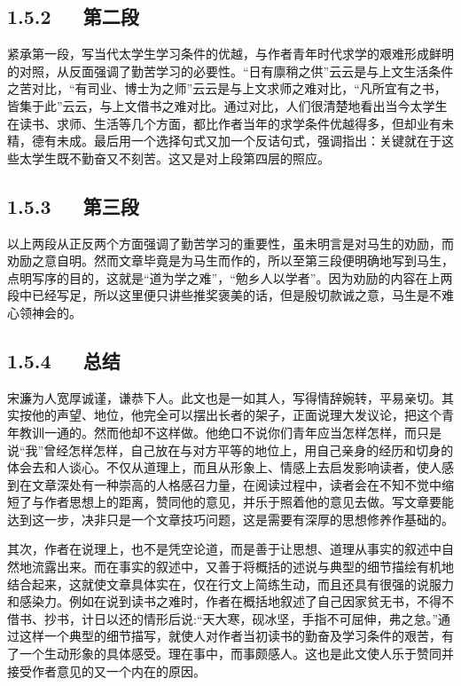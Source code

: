 \documentclass[letterpaper,10pt,english]{sphinxmanual}
\begin{document}
\subsection{1.5.2   第二段}
\label{\detokenize{p01_u6563_u6587/_u5b8b_u6fc2-_u9001_u4e1c_u9633_u9a6c_u751f_u5e8f:id9}}
紧承第一段，写当代太学生学习条件的优越，与作者青年时代求学的艰难形成鲜明的对照，从反面强调了勤苦学习的必要性。“日有廪稍之供”云云是与上文生活条件之苦对比，“有司业、博士为之师”云云是与上文求师之难对比，“凡所宜有之书，皆集于此”云云，与上文借书之难对比。通过对比，人们很清楚地看出当今太学生在读书、求师、生活等几个方面，都比作者当年的求学条件优越得多，但却业有未精，德有未成。最后用一个选择句式又加一个反诘句式，强调指出：关键就在于这些太学生既不勤奋又不刻苦。这又是对上段第四层的照应。


\subsection{1.5.3   第三段}
\label{\detokenize{p01_u6563_u6587/_u5b8b_u6fc2-_u9001_u4e1c_u9633_u9a6c_u751f_u5e8f:id10}}
以上两段从正反两个方面强调了勤苦学习的重要性，虽未明言是对马生的劝励，而劝励之意自明。然而文章毕竟是为马生而作的，所以至第三段便明确地写到马生，点明写序的目的，这就是“道为学之难”，“勉乡人以学者”。因为劝励的内容在上两段中已经写足，所以这里便只讲些推奖褒美的话，但是殷切款诚之意，马生是不难心领神会的。


\subsection{1.5.4   总结}
\label{\detokenize{p01_u6563_u6587/_u5b8b_u6fc2-_u9001_u4e1c_u9633_u9a6c_u751f_u5e8f:id11}}
宋濂为人宽厚诚谨，谦恭下人。此文也是一如其人，写得情辞婉转，平易亲切。其实按他的声望、地位，他完全可以摆出长者的架子，正面说理大发议论，把这个青年教训一通的。然而他却不这样做。他绝口不说你们青年应当怎样怎样，而只是说“我”曾经怎样怎样，自己放在与对方平等的地位上，用自己亲身的经历和切身的体会去和人谈心。不仅从道理上，而且从形象上、情感上去启发影响读者，使人感到在文章深处有一种崇高的人格感召力量，在阅读过程中，读者会在不知不觉中缩短了与作者思想上的距离，赞同他的意见，并乐于照着他的意见去做。写文章要能达到这一步，决非只是一个文章技巧问题，这是需要有深厚的思想修养作基础的。

其次，作者在说理上，也不是凭空论道，而是善于让思想、道理从事实的叙述中自然地流露出来。而在事实的叙述中，又善于将概括的述说与典型的细节描绘有机地结合起来，这就使文章具体实在，仅在行文上简练生动，而且还具有很强的说服力和感染力。例如在说到读书之难时，作者在概括地叙述了自己因家贫无书，不得不借书、抄书，计日以还的情形后说:“天大寒，砚冰坚，手指不可屈伸，弗之怠。”通过这样一个典型的细节描写，就使人对作者当初读书的勤奋及学习条件的艰苦，有了一个生动形象的具体感受。理在事中，而事颇感人。这也是此文使人乐于赞同并接受作者意见的又一个内在的原因。
\end{document}
